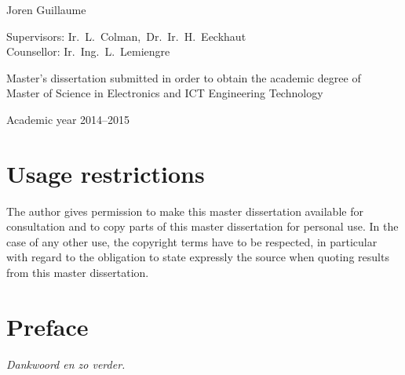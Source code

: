 \documentclass[11pt,british]{article}
\begin{document}
\begin{titlepage}
\begin{center}
\vspace{1.2cm}

Joren Guillaume

\fontsize{12pt}{14pt}
\selectfont

\vspace{3.5cm}

Supervisors: Ir.~L.~Colman,~Dr.~Ir.~H.~Eeckhaut\\
Counsellor: Ir.~Ing.~L.~Lemiengre\\

\vspace{2cm}

Master's dissertation submitted in order to obtain the academic degree of\\
Master of Science in Electronics and ICT Engineering Technology

\vspace{1cm}

Academic year 2014--2015

\end{center}
\end{titlepage}


%


\newpage{}
\part*{Usage restrictions}

The author gives permission to make this master dissertation available for consultation 
and to copy parts of this master dissertation for personal use. 
 In the case of any other use, the copyright terms have to be respected, in particular with regard to 
the obligation to state expressly the source when quoting results from this master dissertation.

\pagebreak{}


\newpage{}\part*{Preface}
\emph{\color{red}Dankwoord en zo verder.}
\pagebreak{}


\newpage{}
\begin{abstract}
\end{abstract}
\end{document}
